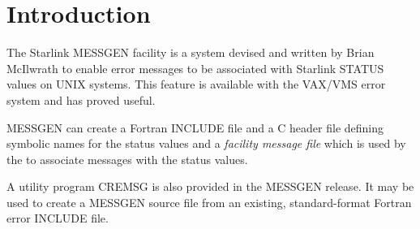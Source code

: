\stardocabstract
 \newpage
 \begin{latexonly}
   \setlength{\parskip}{0mm}
   \latexonlytoc
   \setlength{\parskip}{\medskipamount}
   \markright{\stardocname}
 \end{latexonly}
\newpage
\renewcommand{\thepage}{\arabic{page}}
\setcounter{page}{1}

\section {Introduction}
The Starlink MESSGEN facility is a system devised and written by Brian 
McIlwrath to enable error messages to be associated with Starlink STATUS 
values on UNIX systems.
This feature is available with the VAX/VMS error system and has proved useful.

MESSGEN can create a Fortran INCLUDE file and a C header file defining
symbolic names for the status values and a {\em facility message file}
which is used by the
 to associate 
messages with the status values. 

A utility program CREMSG is also provided in the MESSGEN release. It may be 
used to create a MESSGEN source file from an existing, standard-format Fortran
error INCLUDE file.

